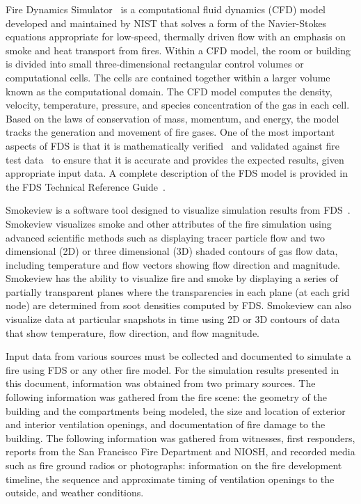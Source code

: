 \documentclass[12pt,oneside]{book}
\begin{document}
Fire Dynamics Simulator~\cite{FDS_Users_Guide} is a computational fluid dynamics (CFD) model developed and maintained by NIST that solves a form of the Navier-Stokes equations appropriate for low-speed, thermally driven flow with an emphasis on smoke and heat transport from fires. Within a CFD model, the room or building is divided into small three-dimensional rectangular control volumes or computational cells. The cells are contained together within a larger volume known as the computational domain. The CFD model computes the density, velocity, temperature, pressure, and species concentration of the gas in each cell. Based on the laws of conservation of mass, momentum, and energy, the model tracks the generation and movement of fire gases. One of the most important aspects of FDS is that it is mathematically verified~\cite{FDS_Verification_Guide} and validated against fire test data~\cite{FDS_Validation_Guide} to ensure that it is accurate and provides the expected results, given appropriate input data. A complete description of the FDS model is provided in the FDS Technical Reference Guide~\cite{FDS_Math_Guide}.

Smokeview is a software tool designed to visualize simulation results from FDS~\cite{Smokeview_Users_Guide}. Smokeview visualizes smoke and other attributes of the fire simulation using advanced scientific methods such as displaying tracer particle flow and two dimensional (2D) or three dimensional (3D) shaded contours of gas flow data, including temperature and flow vectors showing flow direction and magnitude. Smokeview has the ability to visualize fire and smoke by displaying a series of partially transparent planes where the transparencies in each plane (at each grid node) are determined from soot densities computed by FDS. Smokeview can also visualize data at particular snapshots in time using 2D or 3D contours of data that show temperature, flow direction, and flow magnitude.

Input data from various sources must be collected and documented to simulate a fire using FDS or any other fire model. For the simulation results presented in this document, information was obtained from two primary sources. The following information was gathered from the fire scene: the geometry of the building and the compartments being modeled, the size and location of exterior and interior ventilation openings, and documentation of fire damage to the building. The following information was gathered from witnesses, first responders, reports from the San Francisco Fire Department and NIOSH, and recorded media such as fire ground radios or photographs: information on the fire development timeline, the sequence and approximate timing of ventilation openings to the outside, and weather conditions.
\end{document}
